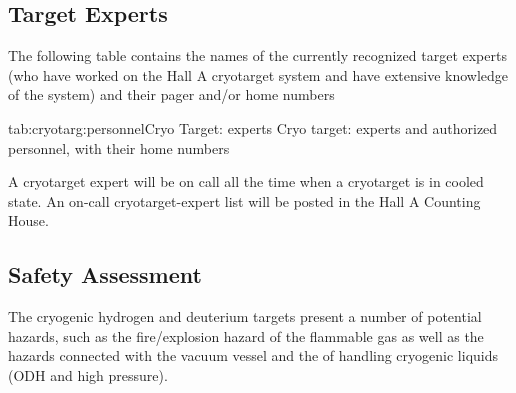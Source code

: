 \begin{safetyen}{10}{10}
\section{Target Experts}
\end{safetyen}

The following table contains the names of the currently recognized target 
experts (who have worked on the Hall A cryotarget system and
have extensive knowledge of the system)
and their pager and/or home numbers

\begin{namestab}{tab:cryotarg:personnel}{Cryo Target: experts}{%
   Cryo target: experts and authorized personnel, with their home numbers}
\end{namestab}

\par
A cryotarget expert will be on call all the time when
a cryotarget is in cooled state.
An on-call cryotarget-expert list will be posted in the 
Hall A Counting House. 



\begin{safetyen}{10}{5}
\section{Safety Assessment}
\label{sec:target-cryo-safety}

The cryogenic hydrogen and deuterium targets present a number of potential
hazards, such as the
fire/explosion hazard of the flammable gas as well as the hazards
connected with
the vacuum vessel and the of handling cryogenic liquids
(ODH and high pressure). 
\end{safetyen}

